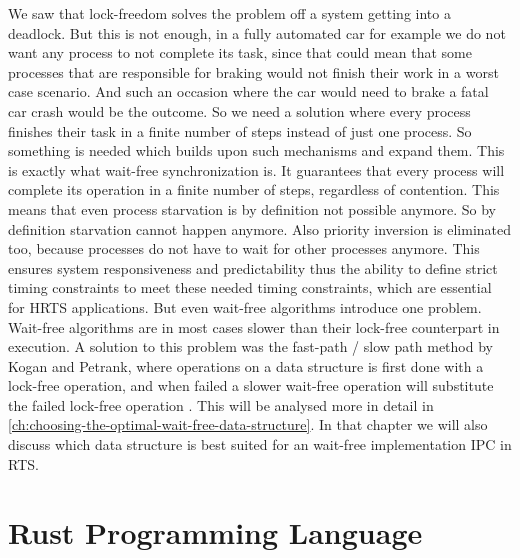 We saw that lock-freedom solves the problem off a system getting into a deadlock. But this is not enough, in a fully automated car for example we do not want any process to not complete its task, since that could mean that some processes that are responsible for braking would not finish their work in a worst case scenario. And such an occasion where the car would need to brake a fatal car crash would be the outcome. So we need a solution where every process finishes their task in a finite number of steps instead of just one process. So something is needed which builds upon such mechanisms and expand them. This is exactly what wait-free synchronization is. It guarantees that every process will complete its operation in a finite number of steps, regardless of contention. This means that even process starvation is by definition not possible anymore. So by definition starvation cannot happen anymore. Also priority inversion is eliminated too, because processes do not have to wait for other processes anymore. This ensures system responsiveness and predictability thus the ability to define strict timing constraints to meet these needed timing constraints, which are essential for \ac{HRTS} applications. But even wait-free algorithms introduce one problem. Wait-free algorithms are in most cases slower than their lock-free counterpart in execution. A solution to this problem was the fast-path / slow path method by Kogan and Petrank, where operations on a data structure is first done with a lock-free operation, and when failed a slower wait-free operation will substitute the failed lock-free operation \cite{kogan2012methodology}. This will be analysed more in detail in \cref{ch:choosing-the-optimal-wait-free-data-structure}. In that chapter we will also discuss which data structure is best suited for an wait-free implementation \ac{IPC} in \ac{RTS}.

\section{Rust Programming Language}\label{sec:rust}

